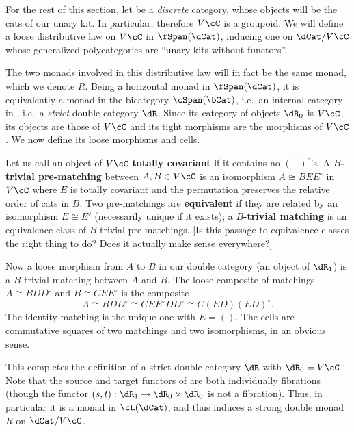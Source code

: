 \documentclass{amsart}
\newcommand{\C}{\cC}
\renewcommand{\o}{^{\circ}}
\begin{document}
For the rest of this section, let \C be a \emph{discrete} category, whose objects will be the cats of our unary kit.
In particular, therefore $V\C$ is a groupoid.
We will define a loose distributive law on $V\C$ in $\fSpan(\dCat)$, inducing one on $\dCat/V\C$ whose generalized polycategories are ``unary kits without functors''.

The two monads involved in this distributive law will in fact be the same monad, which we denote $R$.
Being a horizontal monad in $\fSpan(\dCat)$, it is equivalently a monad in the bicategory $\cSpan(\bCat)$, i.e.\ an internal category in \bCat, i.e.\ a \emph{strict} double category $\dR$.
Since its category of objects $\dR_0$ is $V\C$, its objects are those of $V\C$ and its tight morphisms are the morphisms of $V\C$.
We now define its loose morphisms and cells.

Let us call an object of $V\C$ \textbf{totally covariant} if it contains no $(-)\o$'s.
A \textbf{$B$-trivial pre-matching} between $A,B\in V\C$ is an isomorphism $A \cong B E E\o$ in $V\C$ where $E$ is totally covariant and the permutation preserves the relative order of cats in $B$.
Two pre-matchings are \textbf{equivalent} if they are related by an isomorphism $E\cong E'$ (necessarily unique if it exists); a \textbf{$B$-trivial matching} is an equivalence class of $B$-trivial pre-matchings.
[Is this passage to equivalence classes the right thing to do?  Does it actually make sense everywhere?]

Now a loose morphism from $A$ to $B$ in our double category (an object of $\dR_1$) is a $B$-trivial matching between $A$ and $B$.
The loose composite of matchings $A\cong B D D\o$ and $B \cong C E E\o$ is the composite
\[ A\cong B D D\o \cong C E E\o D D\o \cong C (E D) (E D)\o. \]
The identity matching is the unique one with $E=()$.
The cells are commutative squares of two matchings and two isomorphisms, in an obvious sense.

This completes the definition of a strict double category $\dR$ with $\dR_0 = V\C$.
Note that the source and target functors of \dR are both individually fibrations (though the functor $(s,t):\dR_1 \to \dR_0\times \dR_0$ is not a fibration).
Thus, in particular it is a monad in $\cL(\dCat)$, and thus induces a strong double monad $R$ on $\dCat/V\C$.
\end{document}
